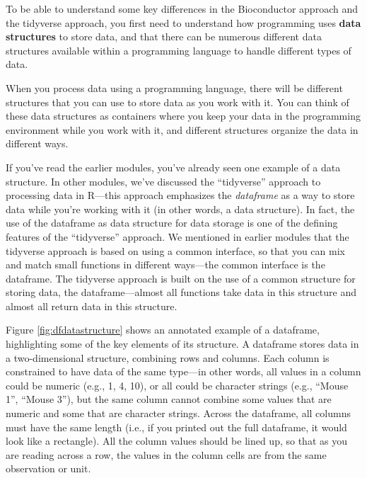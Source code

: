 \documentclass[]{tufte-book}
\begin{document}
To be able to understand some key differences in the Bioconductor approach and the tidyverse approach, you first need to understand how programming uses \textbf{data structures} to store data, and that there can be numerous different data structures available within a programming language to handle different types of data.

When you process data using a programming language, there will be different
structures that you can use to store data as you work with it. You can think of
these data structures as containers where you keep your data in the programming
environment while you work with it, and different structures organize the data
in different ways.

If you've read the earlier modules, you've already seen one example of a data
structure. In other modules, we've discussed the ``tidyverse'' approach to
processing data in R---this approach emphasizes the \emph{dataframe} as a way to
store data while you're working with it (in other words, a data structure). In
fact, the use of the dataframe as data structure for data storage is one of the
defining features of the ``tidyverse'' approach. We mentioned in earlier modules
that the tidyverse approach is based on using a common interface, so that you
can mix and match small functions in different ways---the common interface is
the dataframe. The tidyverse approach is built on the use of a common structure
for storing data, the dataframe---almost all functions take data in this
structure and almost all return data in this structure.

Figure \ref{fig:dfdatastructure} shows an annotated example of a dataframe,
highlighting some of the key elements of its structure. A dataframe stores data
in a two-dimensional structure, combining rows and columns. Each column is
constrained to have data of the same type---in other words, all values in a
column could be numeric (e.g., 1, 4, 10), or all could be character strings
(e.g., ``Mouse 1'', ``Mouse 3''), but the same column cannot combine some values
that are numeric and some that are character strings. Across the dataframe, all
columns must have the same length (i.e., if you printed out the full dataframe,
it would look like a rectangle). All the column values should be lined up, so
that as you are reading across a row, the values in the column cells are from
the same observation or unit.
\end{document}

